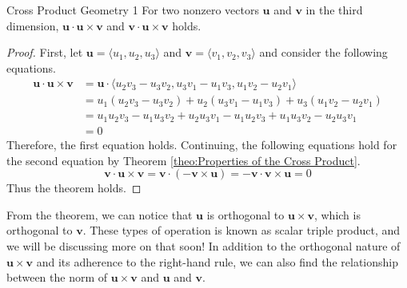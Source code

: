 \documentclass[../../../main.tex]{subfiles}
\begin{document}
\begin{theorem}{}{Cross Product Geometry 1}
For two nonzero vectors $\mathbf{u}$ and $\mathbf{v}$ in the third
dimension, $\mathbf{u} \cdot \mathbf{u} \times \mathbf{v}$ and
$\mathbf{v} \cdot \mathbf{u} \times \mathbf{v}$ holds.
\end{theorem}
\begin{proof}
First, let $\mathbf{u} = \langle u_1, u_2, u_3 \rangle$ and
$\mathbf{v} = \langle v_1, v_2, v_3 \rangle$ and consider the
following equations.
\begin{align*}
    \mathbf{u} \cdot \mathbf{u} \times \mathbf{v} 
    &= \mathbf{u} \cdot \langle
        u_2v_3 - u_3v_2, u_3v_1 - u_1v_3, u_1v_2 - u_2v_1
    \rangle \\
    &= u_1 (u_2v_3 - u_3v_2) + u_2 (u_3v_1 - u_1v_3)
        + u_3 (u_1v_2 - u_2v_1) \\
    &= u_1u_2v_3 - u_1u_3v_2 + u_2u_3v_1 - u_1u_2v_3
        + u_1u_3v_2 - u_2u_3v_1 \\
    &= 0
\end{align*}
Therefore, the first equation holds. Continuing, the following
equations hold for the second equation by Theorem \ref{theo:Properties
of the Cross Product}.
\[
\mathbf{v} \cdot \mathbf{u} \times \mathbf{v}
= \mathbf{v} \cdot (-\mathbf{v} \times \mathbf{u})
= - \mathbf{v} \cdot \mathbf{v} \times \mathbf{u}
= 0
\]
Thus the theorem holds.
\end{proof}

From the theorem, we can notice that $\mathbf{u}$ is orthogonal
to $\mathbf{u} \times \mathbf{v}$, which is orthogonal to
$\mathbf{v}$. These types of operation is known as scalar
triple product, and we will be discussing more on that soon!
In addition to the orthogonal nature of $\mathbf{u} \times \mathbf{v}$
and its adherence to the right-hand rule, we can also find the
relationship between the norm of $\mathbf{u} \times \mathbf{v}$
and $\mathbf{u}$ and $\mathbf{v}$.
\end{document}

